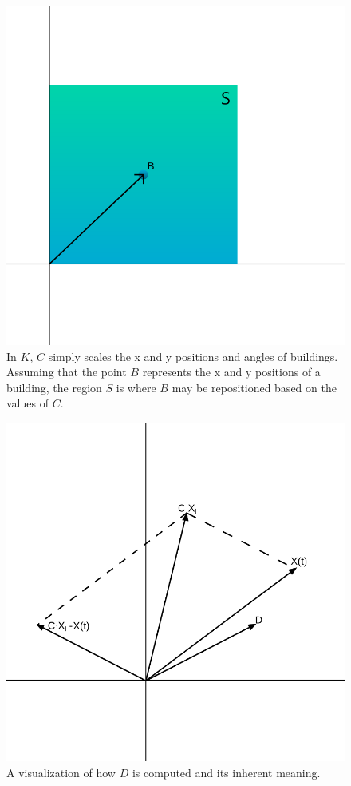 \begin{figure}[h!]
	\centering
	\includegraphics[scale=0.45]{./images/chap05-methodology/gwo-c-effect.png}
	\caption{In $K$, $C$ simply scales the x and y positions and angles of buildings. Assuming that the point $B$ represents the x and y positions of a building, the region $S$ is where $B$ may be repositioned based on the values of $C$.}
	\label{gwo-c-effect}
\end{figure}

\begin{figure}[h!]
	\centering
	\includegraphics[scale=0.45]{./images/chap05-methodology/gwo-d-effect.png}
	\caption{A visualization of how $D$ is computed and its inherent meaning.}
	\label{gwo-d-effect}
\end{figure}

